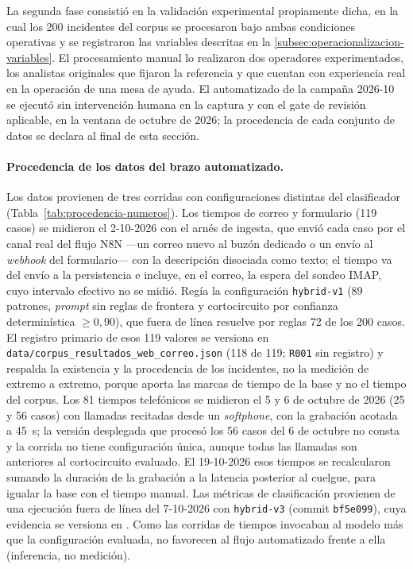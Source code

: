 La segunda fase consistió en la validación experimental propiamente dicha, en la cual los 200 incidentes del corpus se procesaron bajo ambas condiciones operativas y se registraron las variables descritas en la \autoref{subsec:operacionalizacion-variables}. El procesamiento manual lo realizaron dos operadores experimentados, los analistas originales que fijaron la referencia y que cuentan con experiencia real en la operación de una mesa de ayuda. El automatizado de la campaña 2026-10 se ejecutó sin intervención humana en la captura y con el gate de revisión aplicable, en la ventana de octubre de 2026; la procedencia de cada conjunto de datos se declara al final de esta sección.

\paragraph{Procedencia de los datos del brazo automatizado.} Los datos provienen de tres corridas con configuraciones distintas del clasificador (Tabla~\ref{tab:procedencia-numeros}). Los tiempos de correo y formulario (119 casos) se midieron el 2-10-2026 con el arnés de ingesta, que envió cada caso por el canal real del flujo N8N ---un correo nuevo al buzón dedicado o un envío al \emph{webhook} del formulario--- con la descripción disociada como texto; el tiempo va del envío a la persistencia e incluye, en el correo, la espera del sondeo IMAP, cuyo intervalo efectivo no se midió. Regía la configuración \texttt{hybrid-v1} (89 patrones, \emph{prompt} sin reglas de frontera y cortocircuito por confianza determinística \(\geq 0{,}90\)), que fuera de línea resuelve por reglas 72 de los 200 casos. El registro primario de esos 119 valores se versiona en \texttt{data/corpus\_resultados\_web\_correo.json} (118 de 119; \texttt{R001} sin registro) y respalda la existencia y la procedencia de los incidentes, no la medición de extremo a extremo, porque aporta las marcas de tiempo de la base y no el tiempo del corpus. Los 81 tiempos telefónicos se midieron el 5 y 6 de octubre de 2026 (25 y 56 casos) con llamadas recitadas desde un \emph{softphone}, con la grabación acotada a 45~s; la versión desplegada que procesó los 56 casos del 6 de octubre no consta y la corrida no tiene configuración única, aunque todas las llamadas son anteriores al cortocircuito evaluado. El 19-10-2026 esos tiempos se recalcularon sumando la duración de la grabación a la latencia posterior al cuelgue, para igualar la base con el tiempo manual. Las métricas de clasificación provienen de una ejecución fuera de línea del 7-10-2026 con \texttt{hybrid-v3} (commit \texttt{bf5e099}), cuya evidencia se versiona en . Como las corridas de tiempos invocaban al modelo más que la configuración evaluada, no favorecen al flujo automatizado frente a ella (inferencia, no medición).

